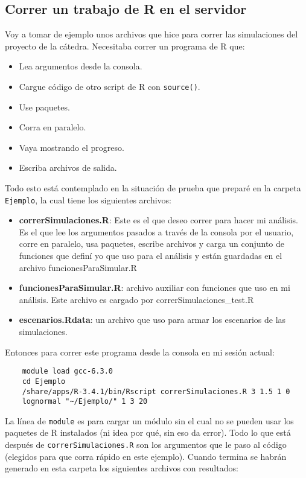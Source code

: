 \documentclass[paper=a4, fontsize=11pt]{scrartcl} %
\numberwithin{equation}{section} %
\numberwithin{figure}{section} %
\numberwithin{table}{section} %
\begin{document}
\subsection{Correr un trabajo de R en el servidor}

Voy a tomar de ejemplo unos archivos que hice para correr las simulaciones del proyecto de la cátedra. Necesitaba correr un programa de R que:

\begin{itemize}
	\item Lea argumentos desde la consola.
	\item Cargue código de otro script de R con \texttt{source()}.
	\item Use paquetes.
	\item Corra en paralelo.
	\item Vaya mostrando el progreso.
	\item Escriba archivos de salida.
\end{itemize}

Todo esto está contemplado en la situación de prueba que preparé en la carpeta \texttt{Ejemplo}, la cual tiene los siguientes archivos:

\begin{itemize}
	\item \textbf{correrSimulaciones.R}: Este es el que deseo correr para hacer mi análisis. Es el que lee los argumentos pasados a través de la consola por el usuario, corre en paralelo, usa paquetes, escribe archivos y carga un conjunto de funciones que definí yo que uso para el análisis y están guardadas en el archivo funcionesParaSimular.R

	\item \textbf{funcionesParaSimular.R}: archivo auxiliar con funciones que uso en mi análisis. Este archivo es cargado por correrSimulaciones\_test.R
	
	\item \textbf{escenarios.Rdata}: un archivo que uso para armar los escenarios de las simulaciones.
\end{itemize}

Entonces para correr este programa desde la consola en mi sesión actual:

\begin{verbatim}
	module load gcc-6.3.0
	cd Ejemplo
	/share/apps/R-3.4.1/bin/Rscript correrSimulaciones.R 3 1.5 1 0 
	lognormal "~/Ejemplo/" 1 3 20	
\end{verbatim}

La línea de \texttt{module} es para cargar un módulo sin el cual no se pueden usar los paquetes de R instalados (ni idea por qué, sin eso da error). Todo lo que está después de \texttt{correrSimulaciones.R} son los argumentos que le paso al código (elegidos para que corra rápido en este ejemplo). Cuando termina se habrán generado en esta carpeta los siguientes archivos con resultados:
\end{document}
